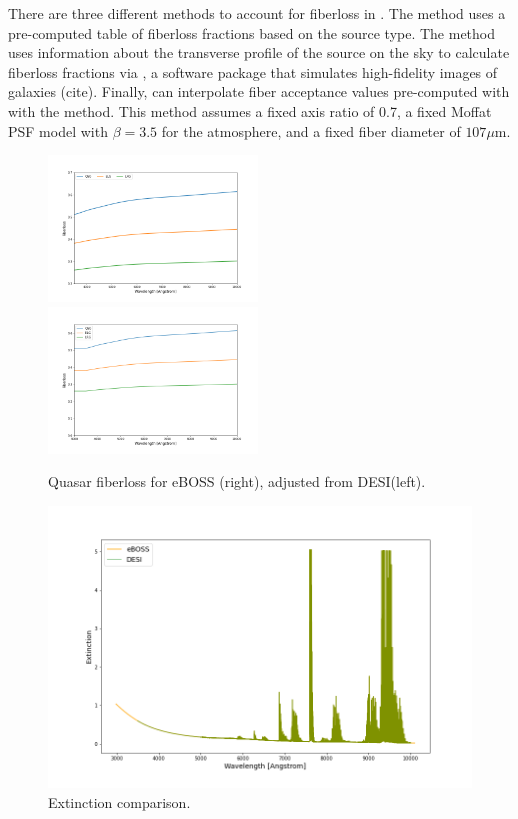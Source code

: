 There are three different methods to account for fiberloss in . The  method uses a pre-computed table of fiberloss fractions based on the source type. The  method uses information about the transverse profile of the source on the sky to calculate fiberloss fractions via , a software package that simulates high-fidelity images of galaxies (cite). Finally,  can interpolate fiber acceptance values pre-computed with  with the  method. This method assumes a fixed axis ratio of 0.7, a fixed Moffat PSF model with $\beta=3.5$ for the atmosphere, and a fixed fiber diameter of $107 \mu$m. 



\begin{figure}[h]
    \centering
    \includegraphics[width=0.495\textwidth]{images/specsim/desimodel-fiberloss.png}
    \includegraphics[width=0.495\textwidth]{images/specsim/eboss_fiberloss.png}
    \caption{Quasar fiberloss for eBOSS (right), adjusted from DESI(left).}
    \label{fig:qso_fiberloss}
\end{figure}




\begin{figure}[h]
\centering
\includegraphics[width=12cm]{images/specsim/extinction.png}
\caption{Extinction comparison.}
\label{fig:extinction}
\end{figure}

